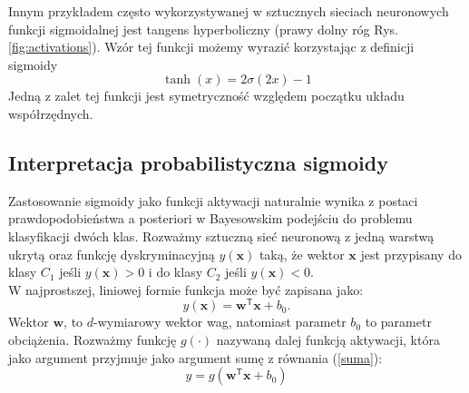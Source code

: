 \documentclass[11pt]{book}
\theoremstyle{definition}
\begin{document}
Innym przykładem często wykorzystywanej w sztucznych sieciach neuronowych funkcji sigmoidalnej jest tangens hyperboliczny (prawy dolny róg Rys. \ref{fig:activations}). Wzór tej funkcji możemy wyrazić korzystając z definicji sigmoidy
\begin{equation}
\tanh(x) = 2\sigma(2x)-1
\end{equation}
%
Jedną z zalet tej funkcji jest symetryczność względem początku układu współrzędnych.
%
\subsection[\color{red} Interpretacja probabilistyczna sigmoidy]{Interpretacja probabilistyczna sigmoidy}
%
Zastosowanie sigmoidy jako funkcji aktywacji naturalnie wynika z postaci prawdopodobieństwa a posteriori w Bayesowskim podejściu do problemu klasyfikacji dwóch klas.
%
Rozważmy sztuczną sieć neuronową z jedną warstwą ukrytą oraz funkcję dyskryminacyjną $y(\mathbf{x})$ taką, że wektor $\mathbf{x}$ jest przypisany do klasy $C_1$ jeśli $y(\mathbf{x}) > 0$ i do klasy $C_2$ jeśli $y(\mathbf{x}) < 0$.
\\
W najprostszej, liniowej formie funkcja może być zapisana jako:
%
\begin{equation}
y(\mathbf{x}) = \mathbf{w}^\mathsf{T} \mathbf{x} + b_0.
\end{equation}
%
Wektor $\mathbf{w}$, to $d$-wymiarowy wektor wag, natomiast parametr $b_0$ to parametr obciążenia.
%
Rozważmy funkcję $g(\cdot)$ nazywaną dalej funkcją aktywacji, która jako argument przyjmuje jako argument sumę z równania (\ref{suma}):
%
\begin{equation}
y = g\left(\mathbf{w}^\mathsf{T} \mathbf{x} + b_0 \right)
\label{suma}
\end{equation}
%
\def\layersep{2.5cm}
\end{document}
